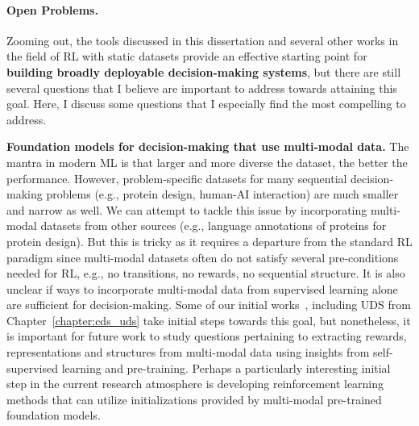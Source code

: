 \documentclass[../thesis.tex]{subfiles}
\begin{document}
\paragraph{Open Problems.} Zooming out, the tools discussed in this dissertation and several other works in the field of RL with static datasets provide an effective starting point for \textbf{building broadly deployable decision-making systems}, but there are still several questions that I believe are important to address towards attaining this goal. Here, I discuss some questions that I especially find the most compelling to address. 

{\textbf{Foundation models for decision-making that use multi-modal data.}} 
The mantra in modern ML is that larger and more diverse the dataset, the better the performance. However, problem-specific datasets for many sequential decision-making problems (e.g., protein design, human-AI interaction) are much smaller and narrow as well. We can attempt to tackle this issue by incorporating multi-modal datasets from other sources (e.g., language annotations of proteins for protein design). But this is tricky as it requires a departure from the standard RL paradigm since multi-modal datasets often do not satisfy several pre-conditions needed for RL, e.g., no transitions, no rewards, no sequential structure. It is also unclear if ways to incorporate multi-modal data from supervised learning alone are sufficient for decision-making. Some of our initial works~\citep{yu2021conservative,yu2022leverage,ajay2020opal}, including UDS from Chapter~\ref{chapter:cds_uds} take initial steps towards this goal, but nonetheless, it is important for future work to study questions pertaining to extracting rewards, representations and structures from multi-modal data using insights from self-supervised learning and pre-training. 
Perhaps a particularly interesting initial step in the current research atmosphere is developing reinforcement learning methods that can utilize initializations provided by multi-modal pre-trained foundation models.  
\end{document}
